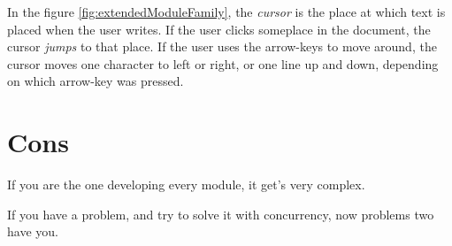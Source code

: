 In the figure \ref{fig:extendedModuleFamily}, the \textit{cursor} is the place
at which text is placed when the user writes. If the user clicks someplace in
the document, the cursor \textit{jumps} to that place. If the user uses the
arrow-keys to move around, the cursor moves one character to left or right, or
one line up and down, depending on which arrow-key was pressed.

\section{Cons}

If you are the one developing every module, it get's very complex.

If you have a problem, and try to solve it with concurrency, now problems two
have you.
